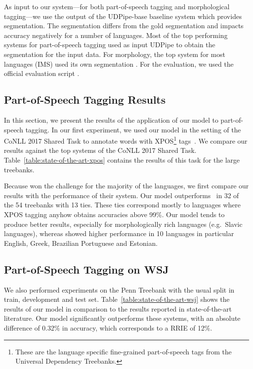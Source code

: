 \documentclass[11pt,a4paper]{article}
\begin{document}
As input to our system---for both part-of-speech tagging and morphological tagging---we use the output of the UDPipe-base baseline system \cite{11234/1-1990} which provides segmentation. The segmentation differs from the gold segmentation and impacts accuracy negatively for a number of languages. Most of the top performing systems for part-of-speech tagging used as input UDPipe to obtain the segmentation for the input data. For morphology, the top system for most languages (IMS) used its own segmentation \cite{bjorkelund-EtAl:2017:K17-3}. For the evaluation, we used the official evaluation script \cite{zeman-EtAl:2017:K17-3}. 



\subsection{Part-of-Speech Tagging Results}

In this section, we present the results of the application of our model to part-of-speech tagging. In our first experiment, we used our model in the setting of the CoNLL 2017 Shared Task to annotate words with XPOS\footnote{These are the language specific fine-grained part-of-speech tags from the Universal Dependency Treebanks.} tags~\cite{zeman-EtAl:2017:K17-3}. We compare our results against the top systems of the CoNLL 2017 Shared Task. Table~\ref{table:state-of-the-art-xpos} contains the results of this task for the large treebanks.



Because  won the challenge for the majority of the languages, we first compare our results with the performance of their system. Our model outperforms~ in 32 of the 54 treebanks with 13 ties. These ties correspond mostly to languages where XPOS tagging anyhow obtains accuracies above 99\%. Our model tends to produce better results, especially for morphologically rich languages (e.g.~Slavic languages), whereas  showed higher performance in 10 languages in particular English, Greek, Brazilian Portuguese and Estonian. 




\subsection{Part-of-Speech Tagging on WSJ}


We also performed experiments on the Penn Treebank  with the usual split in train, development and test set. Table~\ref{table:state-of-the-art-wsj} shows the results of our model in comparison to the results reported in state-of-the-art literature. Our model significantly outperforms these systems, with an absolute difference of 0.32\% in accuracy, which corresponds to a RRIE of 12\%.
\end{document}
